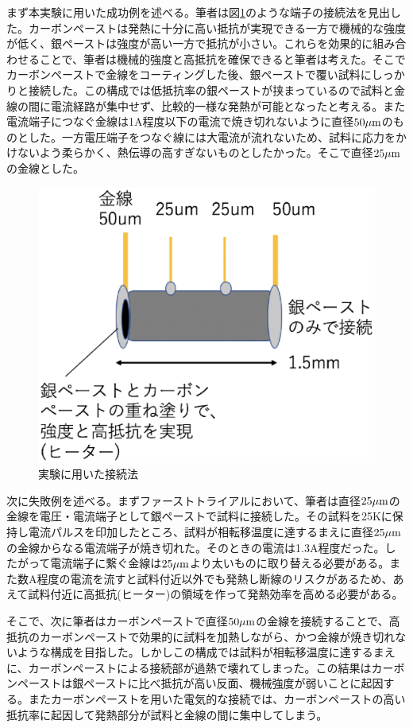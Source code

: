 まず本実験に用いた成功例を述べる。筆者は図\ref{fig:schematics_sample}のような端子の接続法を見出した。カーボンペーストは発熱に十分に高い抵抗が実現できる一方で機械的な強度が低く、銀ペーストは強度が高い一方で抵抗が小さい。これらを効果的に組み合わせることで、筆者は機械的強度と高抵抗を確保できると筆者は考えた。そこでカーボンペーストで金線をコーティングした後、銀ペーストで覆い試料にしっかりと接続した。この構成では低抵抗率の銀ペーストが挟まっているので試料と金線の間に電流経路が集中せず、比較的一様な発熱が可能となったと考える。また電流端子につなぐ金線は1A程度以下の電流で焼き切れないように直径$\rm 50 \mu m$のものとした。一方電圧端子をつなぐ線には大電流が流れないため、試料に応力をかけないよう柔らかく、熱伝導の高すぎないものとしたかった。そこで直径$\rm 25 \mu m$の金線とした。
\begin{figure}[!h]
    \begin{center}
   \includegraphics[width=0.4\hsize]{experiment/schematics_sample.eps}
  \end{center}
  \caption{実験に用いた接続法}
  \label{fig:schematics_sample}
\end{figure}

次に失敗例を述べる。まずファーストトライアルにおいて、筆者は直径$\rm 25 \mu m$の金線を電圧・電流端子として銀ペーストで試料に接続した。その試料を25Kに保持し電流パルスを印加したところ、試料が相転移温度に達するまえに直径$\rm 25 \mu m$の金線からなる電流端子が焼き切れた。そのときの電流は1.3A程度だった。したがって電流端子に繋ぐ金線は$\rm 25 \mu m$より太いものに取り替える必要がある。また数A程度の電流を流すと試料付近以外でも発熱し断線のリスクがあるため、あえて試料付近に高抵抗(ヒーター)の領域を作って発熱効率を高める必要がある。

そこで、次に筆者はカーボンペーストで直径$\rm 50 \mu m$の金線を接続することで、高抵抗のカーボンペーストで効果的に試料を加熱しながら、かつ金線が焼き切れないような構成を目指した。しかしこの構成では試料が相転移温度に達するまえに、カーボンペーストによる接続部が過熱で壊れてしまった。この結果はカーボンペーストは銀ペーストに比べ抵抗が高い反面、機械強度が弱いことに起因する。またカーボンペーストを用いた電気的な接続では、カーボンペーストの高い抵抗率に起因して発熱部分が試料と金線の間に集中してしまう。

